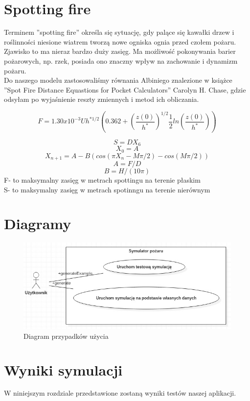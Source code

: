\documentclass[a4paper, 11pt]{article}
\begin{document}
	\section*{Spotting fire}
	\indent
	Terminem ''spotting fire'' określa się sytuację, gdy palące się kawałki drzew i roślinności niesione wiatrem tworzą nowe ogniska ognia przed czołem pożaru. Zjawisko to ma nieraz bardzo duży zasięg.  Ma możliwość pokonywania barier pożarowych, np. rzek, posiada ono znaczny wpływ na zachowanie i dynamizm pożaru.\\
	
	Do naszego modelu zastosowaliśmy równania Albiniego znalezione w książce ''Spot Fire Distance Equastions for Pocket Calculators'' Carolyn H. Chase, gdzie odsyłam po wyjaśnienie reszty zmiennych i metod ich obliczania.
		
		$$F=1.30x10^{-3}Uh^{*1/2}\left( 0.362+\left(\frac{z(0)}{h^{*}}\right)^{1/2}\frac{1}{2}ln\left(\frac{z(0)}{h^{*}}\right) \right)$$
		
		$$S=DX_6$$
		$$X_0=A$$
	$$	X_{n+1}=A-B(cos(\pi X_n-M\pi/2)-cos(M\pi/2))$$
	$$	A=F/D$$
	$$	B=H/(10\pi)		$$
	F- to maksymalny zasięg w metrach spottingu na terenie płaskim\\
	S- to maksymalny zasięg w metrach spotinngu na terenie nierównym\\	
	
	
	\section*{Diagramy}
	\indent
	
	\begin{figure}[H]
		\centerline{\includegraphics[scale=0.9]{usecase1}}
		\raggedright{	\caption{Diagram przypadków użycia}}
	\end{figure}
	
	\section{Wyniki symulacji}
	\indent
	W niniejszym rozdziale przedstawione zostaną wyniki testów naszej aplikacji.
\end{document}
